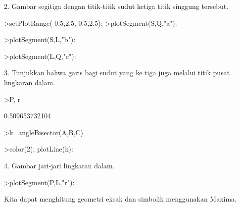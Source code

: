 \documentclass[12pt,Times new roman,letterpaper]{book}
\begin{document}
\begin{eulernootebook}
\begin{eulercomment}
\begin{eulercomment}
\begin{eulernootebook}
\begin{eulercomment}
\begin{eulercomment}
\begin{eulercomment}
\begin{eulercomment}
\begin{eulercomment}
\begin{eulercomment}
\begin{eulernotebook}
\begin{eulercomment}
\begin{eulercomment}
2. Gambar segitiga dengan titik-titik sudut ketiga titik singgung
tersebut.
\end{eulercomment}
\begin{eulerprompt}
>setPlotRange(-0.5,2.5,-0.5,2.5);
>plotSegment(S,Q,"a"):
\end{eulerprompt}
\begin{eulerprompt}
>plotSegment(S,L,"b"):
\end{eulerprompt}
\begin{eulerprompt}
>plotSegment(L,Q,"c"):
\end{eulerprompt}
\begin{eulercomment}
3. Tunjukkan bahwa garis bagi sudut yang ke tiga juga melalui titik
pusat lingkaran dalam.
\end{eulercomment}
\begin{eulerprompt}
>P, r
\end{eulerprompt}
\begin{euleroutput}
  [0.86038,  0.86038]
  0.509653732104
\end{euleroutput}
\begin{eulerprompt}
>k=angleBisector(A,B,C)
\end{eulerprompt}
\begin{euleroutput}
  [-0.264911,  -1.63246,  -1.63246]
\end{euleroutput}
\begin{eulerprompt}
>color(2); plotLine(k):
\end{eulerprompt}
\begin{eulercomment}
4. Gambar jari-jari lingkaran dalam.
\end{eulercomment}
\begin{eulerprompt}
>plotSegment(P,L,"r"):
\end{eulerprompt}
\begin{eulercomment}
Kita dapat menghitung geometri eksak dan simbolik menggunakan Maxima.


\end{eulercomment}
\end{eulercomment}
\end{eulernotebook}
\end{eulercomment}
\end{eulercomment}
\end{eulercomment}
\end{eulercomment}
\end{eulercomment}
\end{eulercomment}
\end{eulernootebook}
\end{eulercomment}
\end{eulercomment}
\end{eulernootebook}
\end{document}
